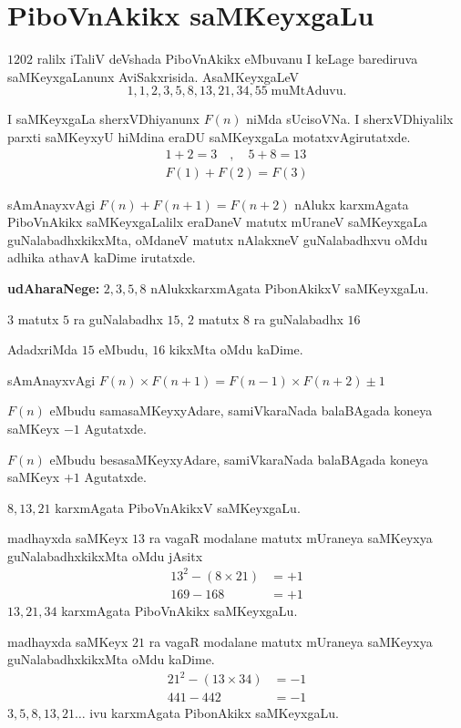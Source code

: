 \chapter{PiboVnAkikx saMKeyxgaLu}
\vskip -20pt

$1202$ ralilx iTaliV deVshada PiboVnAkikx eMbuvanu I keLage barediruva saMKeyxgaLanunx AviSakxrisida. AsaMKeyxgaLeV
$$
1,1,2,3,5,8,13,21,34,55 \;  \text{muMtAduvu}.
$$ 

I saMKeyxgaLa sherxVDhiyanunx $F(n)$ niMda sUcisoVNa. I sherxVDhiyalilx parxti saMKeyxyU hiMdina eraDU saMKeyxgaLa motatxvAgirutatxde.
\begin{gather*}
1+2=3\quad , \quad 5+8=13\\
F(1)+F(2) = F(3)
 \end{gather*}

sAmAnayxvAgi $F(n) + F(n+1) = F(n+2)$ nAlukx karxmAgata PiboVnAkikx saMKeyxgaLalilx eraDaneV matutx mUraneV saMKeyxgaLa guNalabadhxkikxMta, oMdaneV matutx nAlakxneV guNalabadhxvu oMdu adhika athavA kaDime irutatxde.

\textbf{udAharaNege:} \quad $2,3,5,8$ \quad nAlukxkarxmAgata PibonAkikxV saMKeyxgaLu.

$3$ matutx $5$ ra guNalabadhx $15$, $2$ matutx $8$ ra guNalabadhx $16$  

AdadxriMda $15$ eMbudu, $16$ kikxMta oMdu kaDime.

sAmAnayxvAgi $F(n)\times F(n+1) = F(n-1)\times F(n+2)\pm1$ 

$F(n)$ eMbudu samasaMKeyxyAdare, samiVkaraNada balaBAgada koneya saMKeyx $-1$ Agutatxde.

$F(n)$ eMbudu besasaMKeyxyAdare, samiVkaraNada balaBAgada koneya saMKeyx $+1$ Agutatxde.

$8,13,21$ karxmAgata PiboVnAkikxV saMKeyxgaLu.

madhayxda saMKeyx $13$ ra vagaR modalane matutx mUraneya saMKeyxya guNalabadhxkikxMta oMdu jAsitx
\begin{align*}
13^2-(8\times 21) &=+1\\
169-168 &= +1
\end{align*}
$13,21,34$ karxmAgata PiboVnAkikx saMKeyxgaLu. 

madhayxda saMKeyx $21$ ra vagaR  modalane  matutx mUraneya saMKeyxya guNalabadhxkikxMta oMdu kaDime.
\begin{align*}
21^2 - (13\times 34) &= -1 \\
441-442 &= -1
\end{align*}
$3,5,8,13,21\hdots$ ivu karxmAgata PibonAkikx saMKeyxgaLu.

